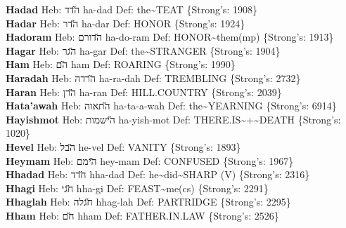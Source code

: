 {\textbf{Hadad} Heb: {\large\H הדד} ha-dad Def: the\textasciitilde{}TEAT \{Strong's: 1908\}\hfill{}\\

\textbf{Hadar} Heb: {\large\H הדר} ha-dar Def: HONOR \{Strong's: 1924\}\hfill{}\\

\textbf{Hadoram} Heb: {\large\H הדורם} ha-do-ram Def: HONOR\textasciitilde{}them(mp) \{Strong's: 1913\}\hfill{}\\

\textbf{Hagar} Heb: {\large\H הגר} ha-gar Def: the\textasciitilde{}STRANGER \{Strong's: 1904\}\hfill{}\\

\textbf{Ham} Heb: {\large\H הם} ham Def: ROARING \{Strong's: 1990\}\hfill{}\\

\textbf{Haradah} Heb: {\large\H הרדה} ha-ra-dah Def: TREMBLING \{Strong's: 2732\}\hfill{}\\

\textbf{Haran} Heb: {\large\H הרן} ha-ran Def: HILL.COUNTRY \{Strong's: 2039\}\hfill{}\\

\textbf{Hata'awah} Heb: {\large\H התאוה} ha-ta-a-wah Def: the\textasciitilde{}YEARNING \{Strong's: 6914\}\hfill{}\\

\textbf{Hayishmot} Heb: {\large\H הישמות} ha-yish-mot Def: THERE.IS\textasciitilde{}+\textasciitilde{}DEATH \{Strong's: 1020\}\hfill{}\\

\textbf{Hevel} Heb: {\large\H הבל} he-vel Def: VANITY \{Strong's: 1893\}\hfill{}\\

\textbf{Heymam} Heb: {\large\H הימם} hey-mam Def: CONFUSED \{Strong's: 1967\}\hfill{}\\

\textbf{Hhadad} Heb: {\large\H חדד} hha-dad Def: he\textasciitilde{}did\textasciitilde{}SHARP (V) \{Strong's: 2316\}\hfill{}\\

\textbf{Hhagi} Heb: {\large\H חגי} hha-gi Def: FEAST\textasciitilde{}me(cs) \{Strong's: 2291\}\hfill{}\\

\textbf{Hhaglah} Heb: {\large\H חגלה} hhag-lah Def: PARTRIDGE \{Strong's: 2295\}\hfill{}\\

\textbf{Hham} Heb: {\large\H חם} hham Def: FATHER.IN.LAW \{Strong's: 2526\}\hfill{}\\

}
